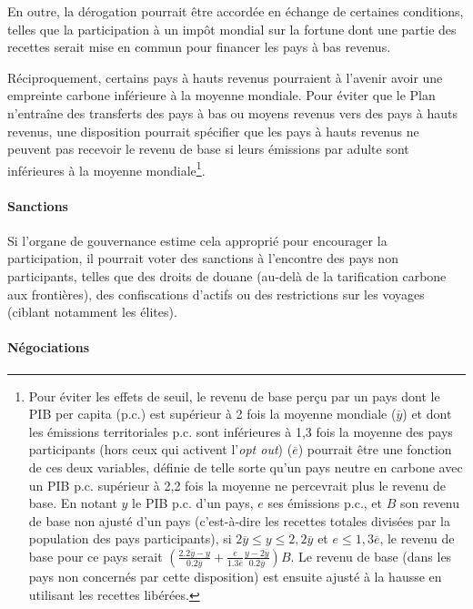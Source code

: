 \documentclass[a5paper,french]{memoir}
\begin{document}
En outre, la dérogation pourrait être accordée en échange de certaines conditions, telles que la participation à un impôt mondial sur la fortune dont une partie des recettes serait mise en commun pour financer les pays à bas revenus.

Réciproquement, certains pays à hauts revenus pourraient à l'avenir avoir une empreinte carbone inférieure à la moyenne mondiale. %
Pour éviter que le Plan n'entraîne des transferts des pays à bas ou moyens revenus vers des pays à hauts revenus, une disposition pourrait spécifier que les pays à hauts revenus ne peuvent pas recevoir le revenu de base si leurs émissions par adulte sont inférieures à la moyenne mondiale\footnote{Pour éviter les effets de seuil, le revenu de base perçu par un pays dont le PIB per capita (p.c.) est supérieur à 2 fois la moyenne mondiale ($\overline{y}$) et dont les émissions territoriales p.c. sont inférieures à 1,3 fois la moyenne des pays participants (hors ceux qui activent l'\textit{opt out}) ($\overline{e}$) pourrait être une fonction de ces deux variables, définie de telle sorte qu'un pays neutre en carbone avec un PIB p.c. supérieur à 2,2 fois la moyenne ne percevrait plus le revenu de base. En notant $y$ le PIB p.c. d'un pays, $e$ ses émissions p.c., et $B$ son revenu de base non ajusté d'un pays (c'est-à-dire les recettes totales divisées par la population des pays participants), si $2\overline{y}\leq y\leq 2,2\overline{y}$ et $e \leq 1,3 \overline{e}$, le revenu de base pour ce pays serait $\left( \frac{2.2\overline{y}-y}{0.2\overline{y}} + \frac{e}{1.3\overline{e}} \frac{y-2\overline{y}}{0.2\overline{y}} \right) B$. Le revenu de base (dans les pays non concernés par cette disposition) est ensuite ajusté à la hausse en utilisant les recettes libérées.}. 

\paragraph{Sanctions}

Si l'organe de gouvernance estime cela approprié pour encourager la participation, il pourrait voter des sanctions à l'encontre des pays non participants, telles que des droits de douane (au-delà de la tarification carbone aux frontières), des confiscations d'actifs ou des restrictions sur les voyages (ciblant notamment les élites).

\paragraph{Négociations}
\end{document}
